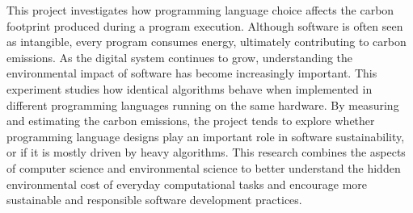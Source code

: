 

This project investigates how programming language choice affects the carbon footprint produced during a program execution. Although software is often seen as intangible, every program consumes energy, ultimately contributing to carbon emissions. As the digital system continues to grow, understanding the environmental impact of software has become increasingly important. This experiment studies how identical algorithms behave when implemented in different programming languages running on the same hardware. By measuring and estimating the carbon emissions, the project tends to explore whether programming language designs play an important role in software sustainability, or if it is mostly driven by heavy algorithms. This research combines the aspects of computer science and environmental science to better understand the hidden environmental cost of everyday computational tasks and encourage more sustainable and responsible software development practices. 


